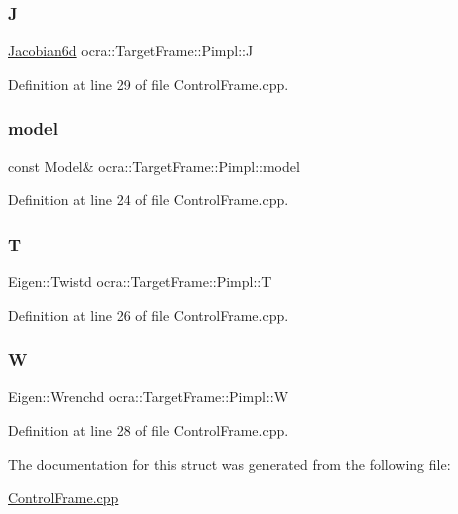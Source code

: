 \subsubsection{\texorpdfstring{J}{J}}
{\footnotesize\ttfamily \hyperlink{namespaceocra_ac73b015f9f7cb0c252c4d5c4800f559a}{Jacobian6d} ocra\+::\+Target\+Frame\+::\+Pimpl\+::J}



Definition at line 29 of file Control\+Frame.\+cpp.

\hypertarget{structocra_1_1TargetFrame_1_1Pimpl_a7edc0b09f919bb223a44001cdba8dc84}{}\label{structocra_1_1TargetFrame_1_1Pimpl_a7edc0b09f919bb223a44001cdba8dc84} 
\subsubsection{\texorpdfstring{model}{model}}
{\footnotesize\ttfamily const Model\& ocra\+::\+Target\+Frame\+::\+Pimpl\+::model}



Definition at line 24 of file Control\+Frame.\+cpp.

\hypertarget{structocra_1_1TargetFrame_1_1Pimpl_aecb4d2e7692ee0ff9298e8802756e098}{}\label{structocra_1_1TargetFrame_1_1Pimpl_aecb4d2e7692ee0ff9298e8802756e098} 
\subsubsection{\texorpdfstring{T}{T}}
{\footnotesize\ttfamily Eigen\+::\+Twistd ocra\+::\+Target\+Frame\+::\+Pimpl\+::T}



Definition at line 26 of file Control\+Frame.\+cpp.

\hypertarget{structocra_1_1TargetFrame_1_1Pimpl_a4ff4bfb5366d48f34539e73fa7b18351}{}\label{structocra_1_1TargetFrame_1_1Pimpl_a4ff4bfb5366d48f34539e73fa7b18351} 
\subsubsection{\texorpdfstring{W}{W}}
{\footnotesize\ttfamily Eigen\+::\+Wrenchd ocra\+::\+Target\+Frame\+::\+Pimpl\+::W}



Definition at line 28 of file Control\+Frame.\+cpp.



The documentation for this struct was generated from the following file\+:\begin{DoxyCompactItemize}
\item 
\hyperlink{ControlFrame_8cpp}{Control\+Frame.\+cpp}\end{DoxyCompactItemize}

